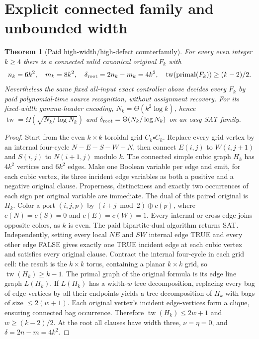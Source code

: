 \documentclass[11pt]{article}
\newtheorem{theorem}{Theorem}
\begin{document}
\section{Explicit connected family and unbounded width}
\begin{theorem}[Paid high-width/high-defect counterfamily]
For every even integer $k\ge4$ there is a connected valid canonical original $F_k$ with
\[
n_k=6k^2,\quad m_k=8k^2,\quad
\delta_{\rm root}=2n_k-m_k=4k^2,\quad
\operatorname{tw}(\operatorname{primal}(F_k))\ge(k-2)/2.
\]
Nevertheless the same fixed all-input exact controller above decides every $F_k$ by paid polynomial-time source recognition, without assignment recovery. For its fixed-width gamma-header encoding, $N_k=\Theta(k^2\log k)$, hence $\operatorname{tw}=\Omega(\sqrt{N_k/\log N_k})$ and $\delta_{\rm root}=\Theta(N_k/\log N_k)$ on an easy SAT family.
\end{theorem}
\begin{proof}
Start from the even $k\times k$ toroidal grid $C_k\square C_k$. Replace every grid vertex by an internal four-cycle $N-E-S-W-N$, then connect $E(i,j)$ to $W(i,j+1)$ and $S(i,j)$ to $N(i+1,j)$ modulo $k$. The connected simple cubic graph $H_k$ has $4k^2$ vertices and $6k^2$ edges. Make one Boolean variable per edge and emit, for each cubic vertex, its three incident edge variables as both a positive and a negative original clause. Properness, distinctness and exactly two occurrences of each sign per original variable are immediate. The dual of this paired original is $H_k$.
Color a port $(i,j,p)$ by $(i+j\bmod2)\oplus c(p)$, where $c(N)=c(S)=0$ and $c(E)=c(W)=1$. Every internal or cross edge joins opposite colors, as $k$ is even. The paid bipartite-dual algorithm returns SAT. Independently, setting every local $NE$ and $SW$ internal edge TRUE and every other edge FALSE gives exactly one TRUE incident edge at each cubic vertex and satisfies every original clause.
Contract the internal four-cycle in each grid cell: the result is the $k\times k$ torus, containing a planar $k\times k$ grid, so $\operatorname{tw}(H_k)\ge k-1$. The primal graph of the original formula is its edge line graph $L(H_k)$. If $L(H_k)$ has a width-$w$ tree decomposition, replacing every bag of edge-vertices by all their endpoints yields a tree decomposition of $H_k$ with bags of size $\le2(w+1)$. Each original vertex's incident edge-vertices form a clique, ensuring connected bag occurrence. Therefore $\operatorname{tw}(H_k)\le2w+1$ and $w\ge(k-2)/2$. At the root all clauses have width three, $\nu=\eta=0$, and $\delta=2n-m=4k^2$. \end{proof}
\end{document}
